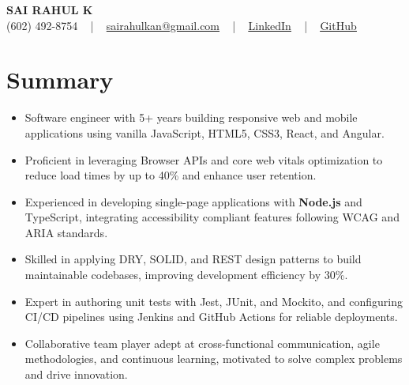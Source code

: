 \documentclass[letterpaper,11pt]{article}
\newcommand{\resumeItem}[1]{
  \item\footnotesize{
    {#1 \vspace{-2pt}}
  }
}
\newcommand{\resumeItemListStart}{\begin{itemize}[leftmargin=*]}
\newcommand{\resumeItemListEnd}{\end{itemize}\vspace{-5pt}}
\begin{document}
\begin{center}
    {\fontsize{14pt}{12pt}\selectfont \textbf{\MakeUppercase{Sai Rahul K}}}\\ \vspace{2pt}
    \fontsize{10pt}{12pt}\selectfont (602) 492-8754 ~ | ~ \href{mailto:sairahulkan@gmail.com}{sairahulkan@gmail.com} ~ | ~
    \href{https://www.linkedin.com/in/rq123/}{\color{blue}\underline{LinkedIn}} ~ | ~
    \href{https://github.com/kanrahuldo}{\color{blue}\underline{GitHub}}~
    \vspace{-8pt}
\end{center}

\section{Summary}
\fontsize{9pt}{10pt}\selectfont
\resumeItemListStart
    \resumeItem{Software engineer with 5+ years building responsive web and mobile applications using vanilla JavaScript, HTML5, CSS3, React, and Angular.}
    \resumeItem{Proficient in leveraging Browser APIs and core web vitals optimization to reduce load times by up to 40\% and enhance user retention.}
    \resumeItem{Experienced in developing single-page applications with \textbf{Node.js} and TypeScript, integrating accessibility compliant features following WCAG and ARIA standards.}
    \resumeItem{Skilled in applying DRY, SOLID, and REST design patterns to build maintainable codebases, improving development efficiency by 30\%.}
    \resumeItem{Expert in authoring unit tests with Jest, JUnit, and Mockito, and configuring CI/CD pipelines using Jenkins and GitHub Actions for reliable deployments.}
    \resumeItem{Collaborative team player adept at cross-functional communication, agile methodologies, and continuous learning, motivated to solve complex problems and drive innovation.}
\resumeItemListEnd
\vspace{-6pt}
\end{document}
